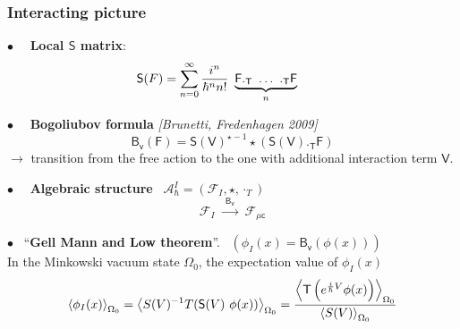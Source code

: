 \documentclass[9pt]{beamer}
\newcommand{\sm}[1]{\left\langle #1 \right\rangle}
\newcommand{\citebeam}[1]{\textit{\textcolor{black!60!white}{[#1]}}}
\newcommand{\Acal}{\mathcal{A}}
\newcommand{\Fcal}{\mathcal{F}}
\newcommand{\Bsf}{\mathsf{B}}
\newcommand{\Fsf}{\mathsf{F}}
\newcommand{\Ssf}{\mathsf{S}}
\newcommand{\Tsf}{\mathsf{T}}
\newcommand{\Vsf}{\mathsf{V}}
\newcommand{\csf}{\mathsf{c}}
\newcommand{\vsf}{\mathsf{v}}
\begin{document}
\begin{frame}

\frametitle{Interacting picture}

\vfill

$\bullet \quad$ \textbf{Local $\Ssf$ matrix}:
\vspace*{-17pt}
\begin{equation*}
 \hspace*{-25pt} \Ssf(F) = \sum_{n=0}^{\infty} \frac{i^n}{\hbar^n n!} \ \underbrace{\Fsf ._\Tsf \ \dots \ ._\Tsf \Fsf}_{n}
\end{equation*}





\vfill

$\bullet \quad$ \textbf{Bogoliubov formula} \citebeam{Brunetti, Fredenhagen 2009} \\[-10pt]
\begin{equation*}
 \Bsf_\vsf(\Fsf) = \Ssf(\Vsf)^{\star -1} \star \left( \Ssf(\Vsf) ._{\Tsf} \Fsf \right) 
\end{equation*}
$\to$  transition from the free action to the one with additional interaction term $\Vsf$.






\vfill

$\bullet \quad$ \textbf{Algebraic structure} \ $\Acal^I_\hbar = \left( \Fcal_{I} , \star , \cdot_T \right)$
\begin{equation*}
\Fcal_{I} \ \overset{\ \ \Bsf_\vsf \ \ }{\longrightarrow} \ \Fcal_{\mu \csf}
\end{equation*}

\vfill

$\bullet$ \ ``\textbf{Gell Mann and Low theorem}''. \ $\left( \phi_I(x) = \Bsf_\vsf(\phi(x)) \right)$ \\

\hspace*{9pt} In the Minkowski vacuum state $\Omega_0$, the expectation value of $\phi_I(x)$
\vspace*{-6pt}
\begin{equation*}
\sm{ \phi_I(x) }_{\Omega_0} 
= 
\sm{ S(V)^{-1} T( \Ssf(V) \ \phi(x)) }_{\Omega_0} 
= 
\frac{%
\sm{ \Tsf\left(e^{\frac{i}{\hbar} V} \phi(x) \right) }_{\Omega_0}
}{%
\left\langle S(V) \right\rangle_{\Omega_0}
}
\end{equation*}


\end{frame}  
\end{document}
